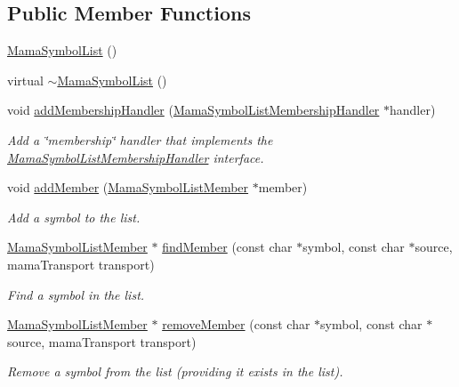 \subsection*{Public Member Functions}
\begin{DoxyCompactItemize}
\item 
\hyperlink{classWombat_1_1MamaSymbolList_ad1f53322a205ead3d1097e99912ab27b}{MamaSymbolList} ()
\item 
virtual \hyperlink{classWombat_1_1MamaSymbolList_af454a9e117d313041d33753b9eff4903}{$\sim$MamaSymbolList} ()
\item 
void \hyperlink{classWombat_1_1MamaSymbolList_af47e92be8419abad5697fbab50d50586}{addMembershipHandler} (\hyperlink{classWombat_1_1MamaSymbolListMembershipHandler}{MamaSymbolListMembershipHandler} $\ast$handler)
\begin{DoxyCompactList}\small\item\em Add a \char`\"{}membership\char`\"{} handler that implements the \hyperlink{classWombat_1_1MamaSymbolListMembershipHandler}{MamaSymbolListMembershipHandler} interface. \item\end{DoxyCompactList}\item 
void \hyperlink{classWombat_1_1MamaSymbolList_a642e9f34f4834f9ec0aa4f0721eca248}{addMember} (\hyperlink{classWombat_1_1MamaSymbolListMember}{MamaSymbolListMember} $\ast$member)
\begin{DoxyCompactList}\small\item\em Add a symbol to the list. \item\end{DoxyCompactList}\item 
\hyperlink{classWombat_1_1MamaSymbolListMember}{MamaSymbolListMember} $\ast$ \hyperlink{classWombat_1_1MamaSymbolList_a939f23262e592899a253631dec0d37bf}{findMember} (const char $\ast$symbol, const char $\ast$source, mamaTransport transport)
\begin{DoxyCompactList}\small\item\em Find a symbol in the list. \item\end{DoxyCompactList}\item 
\hyperlink{classWombat_1_1MamaSymbolListMember}{MamaSymbolListMember} $\ast$ \hyperlink{classWombat_1_1MamaSymbolList_a45860e5e044a1945d1b1932d0ef33424}{removeMember} (const char $\ast$symbol, const char $\ast$source, mamaTransport transport)
\begin{DoxyCompactList}\small\item\em Remove a symbol from the list (providing it exists in the list). \item\end{DoxyCompactList}\item 

\end{DoxyCompactItemize}
